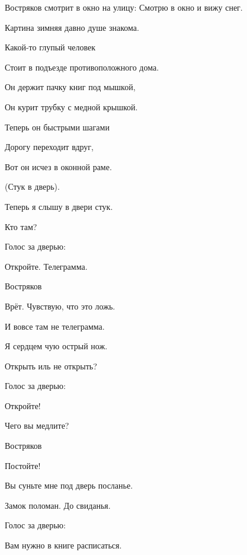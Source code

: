 \leavevmode\hspace{-1cm}
\fontsize{14}{16}\selectfont Востряков \normalsize смотрит в окно на улицу:
Смотрю в окно и вижу снег.
 
Картина зимняя давно душе знакома.
 
Какой-то глупый человек
 
Стоит в подъезде противоположного дома.
 
Он держит пачку книг под мышкой,
 
Он курит трубку с медной крышкой.
 
Теперь он быстрыми шагами
 
Дорогу переходит вдруг,
 
Вот он исчез в оконной раме.
 
\begin{center}
(Стук в дверь).
\end{center}
 
Теперь я слышу в двери стук.
 
Кто там?
 
\leavevmode\hspace{-1cm}
\fontsize{14}{16}\selectfont Голос за дверью: \normalsize
 
Откройте. Телеграмма.
 
\leavevmode\hspace{-1cm}
\fontsize{14}{16}\selectfont Востряков \normalsize
 
Врёт. Чувствую, что это ложь.
 
И вовсе там не телеграмма.
 
Я сердцем чую острый нож.
 
Открыть иль не открыть?
 
\leavevmode\hspace{-1cm}
\fontsize{14}{16}\selectfont Голос за дверью: \normalsize
 
Откройте!
 
Чего вы медлите?
 
\leavevmode\hspace{-1cm}
\fontsize{14}{16}\selectfont Востряков \normalsize
 
Постойте!
 
Вы суньте мне под дверь посланье.
 
Замок поломан. До свиданья.
 
\leavevmode\hspace{-1cm}
\fontsize{14}{16}\selectfont Голос за дверью: \normalsize
 
Вам нужно в книге расписаться.
 
